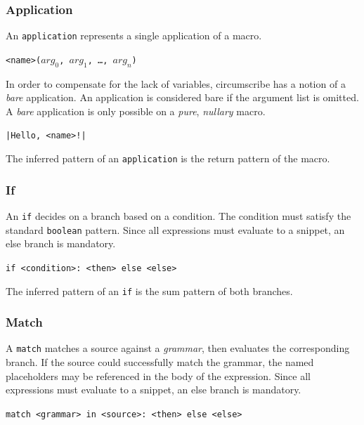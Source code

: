 \documentclass{article}
\begin{document}
\subsubsection{Application}

An \texttt{application} represents a single application of a macro.

\begin{center}
    \texttt{<name>($arg_0$, $arg_1$, \dots, $arg_n$)}
\end{center}

In order to compensate for the lack of variables, circumscribe has a notion
of a \emph{bare} application. An application is considered bare if the argument
list is omitted. A \emph{bare} application is only possible on a \emph{pure},
\emph{nullary} macro.

\begin{center}
    \verb/|Hello, <name>!|/
\end{center}

The inferred pattern of an \texttt{application} is the return pattern of the macro.

\subsubsection{If}

An \texttt{if} decides on a branch based on a condition. The condition must satisfy the standard
\texttt{boolean} pattern. Since all expressions must evaluate to a snippet, an else branch
is mandatory.

\begin{center}
    \verb|if <condition>: <then> else <else>|
\end{center}

The inferred pattern of an \texttt{if} is the sum pattern of both branches.

\subsubsection{Match}

A \texttt{match} matches a source against a \emph{grammar}, then evaluates
the corresponding branch. If the source could successfully match the grammar,
the named placeholders may be referenced in the body of the expression. Since all expressions must evaluate to a snippet, an else branch
is mandatory.

\begin{center}
    \verb|match <grammar> in <source>: <then> else <else>|
\end{center}
\end{document}
